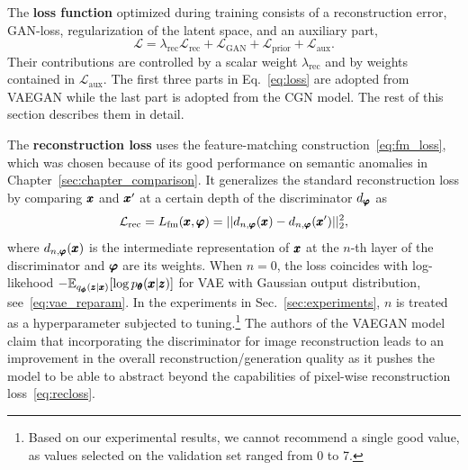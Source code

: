 The \textbf{loss function} optimized during training consists of a reconstruction error, GAN-loss, regularization of the latent space, and an auxiliary part, 
\begin{equation}
    \mathcal{L} = \lambda_{\text{rec}}\mathcal{L}_{\text{rec}} + \mathcal{L}_{\text{GAN}} +  \mathcal{L}_{\text{prior}} + \mathcal{L}_{\text{aux}}.
    \label{eq:loss}
\end{equation}
Their contributions are controlled by a scalar weight $\lambda_{\text{rec}}$ and by weights contained in $\mathcal{L}_{\text{aux}}.$ The first three parts in Eq.~\eqref{eq:loss} are adopted from VAEGAN while the last part is adopted from the CGN model. The rest of this section describes them in detail.

The \textbf{reconstruction loss} uses the feature-matching construction~\eqref{eq:fm_loss}, which was chosen because of its good performance on semantic anomalies in Chapter~\ref{sec:chapter_comparison}. It generalizes the standard reconstruction loss by comparing $\pmb{{x}}$ and $\pmb{{x}}'$ at a certain depth of the discriminator $d_{\pmb{{\varphi}}}$ as
\begin{equation} \label{eq:recloss}
     \mathcal{L}_{\text{rec}} = L_{\text{fm}}(\pmb{{x}},\pmb{{\varphi}}) =\vert \vert d_{n,\pmb{{\varphi}}}(\pmb{{x}}) - d_{n,\pmb{{\varphi}}}(\pmb{{x}}{'}) \vert \vert_2^2,
\end{equation} 
where $d_{n,\pmb{{\varphi}}}(\pmb{{x}})$ is the intermediate representation of $\pmb{{x}}$ at the $n$-th layer of the discriminator and $\pmb{{\varphi}}$ are its weights. When $n=0$, the loss coincides with log-likehood $-\mathbb{E}_{q_{\pmb{{\phi}}}(\pmb{{z}} \vert \pmb{{x}})}[\log p_{\pmb{{\theta}}}(\pmb{{x}} \vert \pmb{{z}})]$ for VAE with Gaussian output distribution, see~\eqref{eq:vae_reparam}. In the experiments in Sec.~\ref{sec:experiments}, $n$ is treated as a hyperparameter subjected to tuning.\footnote{Based on our experimental results, we cannot recommend a single good value, as values selected on the validation set ranged from 0 to 7.} The authors of the VAEGAN model claim that incorporating the discriminator for image reconstruction leads to an improvement in the overall reconstruction/generation quality as it pushes the model to be able to abstract beyond the capabilities of pixel-wise reconstruction loss~\eqref{eq:recloss}.

